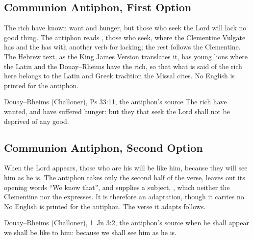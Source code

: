 \subsection{Communion Antiphon, First Option}
\label{proper-communion-antiphon-a}


\noindent The rich have known want and hunger, but those who seek the Lord will
lack no good thing. The antiphon reads , those who seek, where
the Clementine Vulgate has  and the  has
 with another verb for lacking; the rest follows the
Clementine. The Hebrew text, as the King James Version translates it, has young
lions where the Latin and the Douay--Rheims have the rich, so that what is said
of the rich here belongs to the Latin and Greek tradition the Missal cites. No
English is printed for the antiphon.

\begin{englishwitness}{Douay--Rheims (Challoner), Ps 33:11, the antiphon's source}
The rich have wanted, and have suffered hunger: but they that seek the Lord
shall not be deprived of any good.
\end{englishwitness}

\subsection{Communion Antiphon, Second Option}
\label{proper-communion-antiphon-b}


\noindent When the Lord appears, those who are his will be like him, because
they will see him as he is. The antiphon takes only the second half of the
verse, leaves out its opening words ``We know that'', and supplies a subject,
, which neither the Clementine nor the 
expresses. It is therefore an adaptation, though it carries no  No
English is printed for the antiphon. The verse it adapts follows.

\begin{englishwitness}{Douay--Rheims (Challoner), 1~Jn 3:2, the antiphon's source}
 when he shall appear we shall be like
to him: because we shall see him as he is.
\end{englishwitness}

